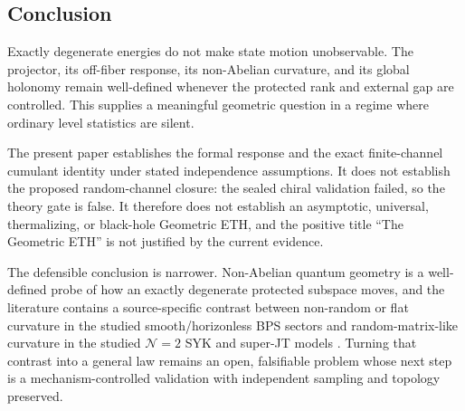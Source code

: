 \subsection{Conclusion}
\label{sec:discussion-conclusion}

Exactly degenerate energies do not make state motion unobservable.  The
projector, its off-fiber response, its non-Abelian curvature, and its global
holonomy remain well-defined whenever the protected rank and external gap are
controlled.  This supplies a meaningful geometric question in a regime where
ordinary level statistics are silent.

The present paper establishes the formal response and the exact finite-channel
cumulant identity under stated independence assumptions.  It does not
establish the proposed random-channel closure: the sealed chiral validation
failed, so the theory gate is false.  It therefore does not establish an
asymptotic, universal, thermalizing, or black-hole Geometric ETH, and the
positive title ``The Geometric ETH'' is not justified by the current evidence.

The defensible conclusion is narrower.  Non-Abelian quantum geometry is a
well-defined probe of how an exactly degenerate protected subspace moves, and
the literature contains a source-specific contrast between non-random or flat
curvature in the studied smooth/horizonless BPS sectors and random-matrix-like
curvature in the studied $\mathcal{N}=2$ SYK and super-JT models
\cite{chen2026berry}.  Turning that contrast into a general law remains an
open, falsifiable problem whose next step is a mechanism-controlled validation
with independent sampling and topology preserved.
